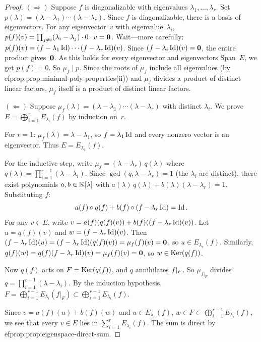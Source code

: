 \begin{proof}
$(\Rightarrow)$\; Suppose $f$ is diagonalizable with eigenvalues
$\lambda_1,\ldots,\lambda_r$.  Set
$p(\lambda) = (\lambda-\lambda_1)\cdots(\lambda-\lambda_r)$.  Since $f$
is diagonalizable, there is a basis of eigenvectors.  For any
eigenvector~$v$ with eigenvalue~$\lambda_i$,
$p(f)(v) = \prod_{j\neq i}(\lambda_i - \lambda_j)\cdot 0 \cdot v = \mathbf{0}$.
Wait---more carefully:
$p(f)(v) = (f-\lambda_1\operatorname{Id})\cdots(f-\lambda_r\operatorname{Id})(v)$.  Since
$(f - \lambda_i\operatorname{Id})(v) = \mathbf{0}$, the entire product gives~$\mathbf{0}$.
As this holds for every eigenvector and eigenvectors Span~$E$, we get
$p(f) = 0$.  So $\mu_f \mid p$.  Since the roots of $\mu_f$ include
all eigenvalues (by 
ef{prop:prop:minimal-poly-properties}(ii)) and
$\mu_f$ divides a product of distinct linear factors, $\mu_f$ itself
is a product of distinct linear factors.

$(\Leftarrow)$\; Suppose $\mu_f(\lambda)=(\lambda-\lambda_1)\cdots
(\lambda-\lambda_r)$ with distinct $\lambda_i$.  We prove
$E = \bigoplus_{i=1}^r E_{\lambda_i}(f)$ by induction on~$r$.

For $r = 1$: $\mu_f(\lambda) = \lambda - \lambda_1$, so
$f = \lambda_1\operatorname{Id}$ and every nonzero vector is an eigenvector.
Thus $E = E_{\lambda_1}(f)$.

For the inductive step, write
$\mu_f = (\lambda - \lambda_r)\,q(\lambda)$ where
$q(\lambda) = \prod_{i=1}^{r-1}(\lambda - \lambda_i)$.  Since
$\gcd(q, \lambda-\lambda_r) = 1$ (the $\lambda_i$ are distinct),
there exist polynomials $a,b\in{\mathbb{K}}[\lambda]$ with
$a(\lambda)\,q(\lambda) + b(\lambda)(\lambda-\lambda_r) = 1$.
Substituting $f$:
\[
  a(f)\circ q(f) + b(f)\circ(f - \lambda_r\operatorname{Id}) = \operatorname{Id}.
\]
For any $v\in E$, write $v = a(f)(q(f)(v)) + b(f)((f-\lambda_r\operatorname{Id})(v))$.
Let $u = q(f)(v)$ and $w = (f-\lambda_r\operatorname{Id})(v)$.  Then
$(f-\lambda_r\operatorname{Id})(u) = (f-\lambda_r\operatorname{Id})(q(f)(v)) = \mu_f(f)(v) = \mathbf{0}$,
so $u\in E_{\lambda_r}(f)$.  Similarly,
$q(f)(w) = q(f)(f-\lambda_r\operatorname{Id})(v) = \mu_f(f)(v) = \mathbf{0}$, so
$w\in\operatorname{Ker}(q(f))$.

Now $q(f)$ acts on $F = \operatorname{Ker}(q(f))$, and $q$ annihilates $f{|_{F}}$.
So $\mu_{f|_F}$ divides $q = \prod_{i=1}^{r-1}(\lambda-\lambda_i)$.
By the induction hypothesis, $F = \bigoplus_{i=1}^{r-1}E_{\lambda_i}(f|_F)
\subset \bigoplus_{i=1}^{r-1}E_{\lambda_i}(f)$.

Since $v = a(f)(u) + b(f)(w)$ and $u\in E_{\lambda_r}(f)$,
$w\in F\subset\bigoplus_{i=1}^{r-1}E_{\lambda_i}(f)$, we see that
every $v\in E$ lies in $\sum_{i=1}^r E_{\lambda_i}(f)$.  The sum is
direct by 
ef{prop:prop:eigenspace-direct-sum}.
\end{proof}



